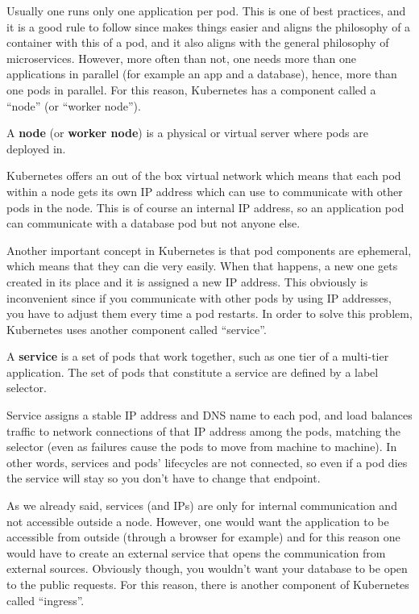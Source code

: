 Usually one runs only one application per pod. This is one of best practices, and it is a good rule to follow since
makes things easier and aligns the philosophy of a container with this of a pod, and it also aligns with the general
philosophy of microservices. However, more often than not, one needs more than one applications in parallel (for
example an app and a database), hence, more than one pods in parallel. For this reason, Kubernetes has a component
called a ``node'' (or ``worker node'').

A \textbf{node} (or \textbf{worker node}) is a physical or virtual server where pods are deployed in.
\ed


Kubernetes offers an out of the box virtual network which means that each pod within a node gets its own IP address
which can use to communicate with other pods in the node. This is of course an internal IP address, so an application
pod can communicate with a database pod but not anyone else.


Another important concept in Kubernetes is that pod components are ephemeral, which means that they can die very
easily. When that happens, a new one gets created in its place and it is assigned a new IP address. This obviously is
inconvenient since if you communicate with other pods by using IP addresses, you have to adjust them every time a pod
restarts. In order to solve this problem, Kubernetes uses another component called ``service''.

\bd[Service]
A \textbf{service} is a set of pods that work together, such as one tier of a multi-tier application. The set of
pods that constitute a service are defined by a label selector.
\ed

Service assigns a stable IP address and DNS name to each pod, and load balances traffic to network connections of
that IP address among the pods, matching the selector (even as failures cause the pods to move from machine to
machine). In other words, services and pods' lifecycles are not connected, so even if a pod dies the service will
stay so you don't have to change that endpoint.


As we already said, services (and IPs) are only for internal communication and not accessible outside a node.
However, one would want the application to be accessible from outside (through a browser for example) and for this
reason one would have to create an external service that opens the communication from external sources. Obviously
though, you wouldn't want your database to be open to the public requests. For this reason, there is another
component of Kubernetes called ``ingress''.

